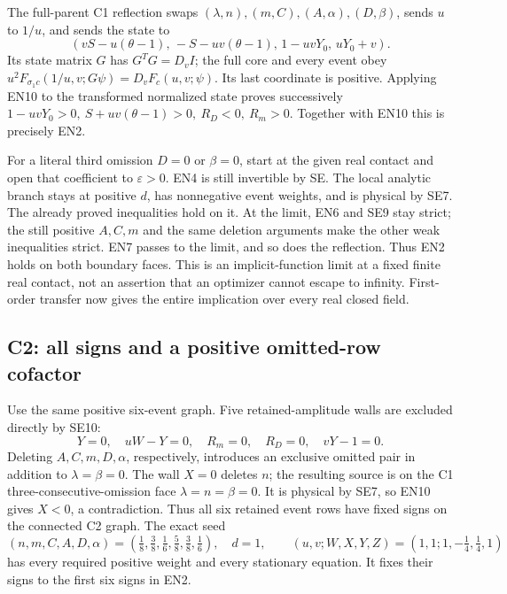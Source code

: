 The full-parent C1 reflection swaps
\((\lambda,n),(m,C),(A,\alpha),(D,\beta)\), sends \(u\) to \(1/u\),
and sends the state to
\[
 (vS-u(\theta-1),\,-S-uv(\theta-1),\,
                   1-uvY_0,\,uY_0+v).
\]
Its state matrix \(G\) has \(G^TG=D_vI\); the full core and every event
obey \(u^2F_{\sigma_1c}(1/u,v;G\psi)=D_vF_c(u,v;\psi)\).
Its last coordinate is positive.
Applying EN10 to the transformed normalized state proves successively
\(1-uvY_0>0,\ S+uv(\theta-1)>0,\ R_D<0,\ R_m>0\).
Together with EN10 this is precisely EN2.

For a literal third omission \(D=0\) or \(\beta=0\), start at the
given real contact and open that coefficient to \(\varepsilon>0\).
EN4 is still invertible by SE.  The local analytic branch stays at
positive \(d\), has nonnegative event weights, and is physical by SE7.
The already proved inequalities hold on it.  At the limit, EN6 and
SE9 stay strict; the still positive \(A,C,m\) and the same deletion
arguments make the other weak inequalities strict.  EN7 passes to
the limit, and so does the reflection.  Thus EN2 holds on both
boundary faces.  This is an implicit-function limit at a fixed
finite real contact, not an assertion that an optimizer cannot escape
to infinity.  First-order transfer now gives the entire implication
over every real closed field.

\subsection{C2: all signs and a positive omitted-row cofactor}

Use the same positive six-event graph.  Five retained-amplitude walls
are excluded directly by SE10:
\[
 Y=0,\quad uW-Y=0,\quad R_m=0,\quad R_D=0,\quad vY-1=0.
 \tag{EN11}
\]
Deleting \(A,C,m,D,\alpha\), respectively, introduces an exclusive
omitted pair in addition to \(\lambda=\beta=0\).
The wall \(X=0\) deletes \(n\); the resulting source is on the C1
three-consecutive-omission face \(\lambda=n=\beta=0\).
It is physical by SE7, so EN10 gives \(X<0\), a contradiction.
Thus all six retained event rows have fixed signs on the connected
C2 graph.  The exact seed
\[
 (n,m,C,A,D,\alpha)=(\tfrac18,\tfrac38,\tfrac16,
                              \tfrac58,\tfrac38,\tfrac16),\quad d=1,
 \qquad (u,v;W,X,Y,Z)=(1,1;1,-\tfrac14,\tfrac14,1)
\]
has every required positive weight and every stationary equation.
It fixes their signs to the first six signs in EN2.

